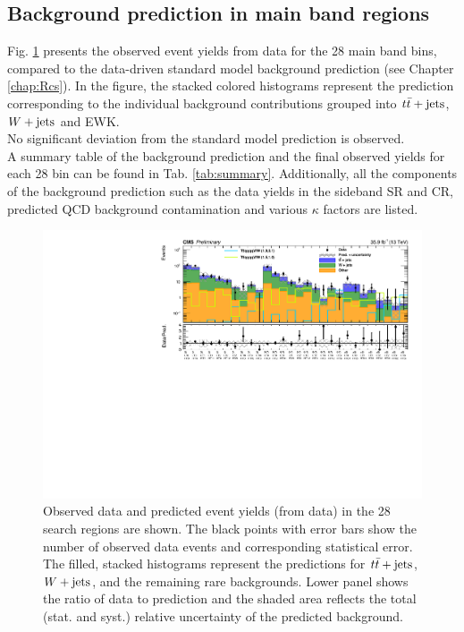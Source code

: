 \subsection{Background prediction in main band regions}
\label{sec:Resmain}
Fig. \ref{fig:mainRes} presents the observed event yields from data for the 28 main band bins, compared to the data-driven standard model background prediction (see Chapter \ref{chap:Rcs}). 
In the figure, the stacked colored histograms represent the prediction corresponding to the individual background contributions grouped into $t\bar{t}+\textrm{jets}$,$W+\textrm{jets}$ and EWK. \\
No significant deviation from the standard model prediction is observed.\\
A summary table of the background prediction and the final observed yields for each 28 bin can be found in Tab. \ref{tab:summary}.
Additionally, all the components of the background prediction such as the data yields in the sideband SR and CR, predicted QCD background contamination and various $\kappa$ factors are listed.\\
\begin{figure}[!h]
\begin{center}
    \includegraphics[width=0.9 \textwidth]{Plots/analysis/results/CMS-PAS-SUS-16-042_Figure_003}
    \caption{Observed data and predicted event yields (from data) in the 28 search regions are shown. The black points with error bars show the number of observed data events and corresponding statistical error. The filled, stacked histograms represent the predictions for $t\bar{t}+\textrm{jets}$, $W+\textrm{jets}$, and the remaining rare backgrounds. Lower panel shows the ratio of data to prediction and the shaded area reflects the total (stat. and syst.) relative uncertainty of the predicted background. 
    }
    \label{fig:mainRes}
\end{center}
\end{figure}
